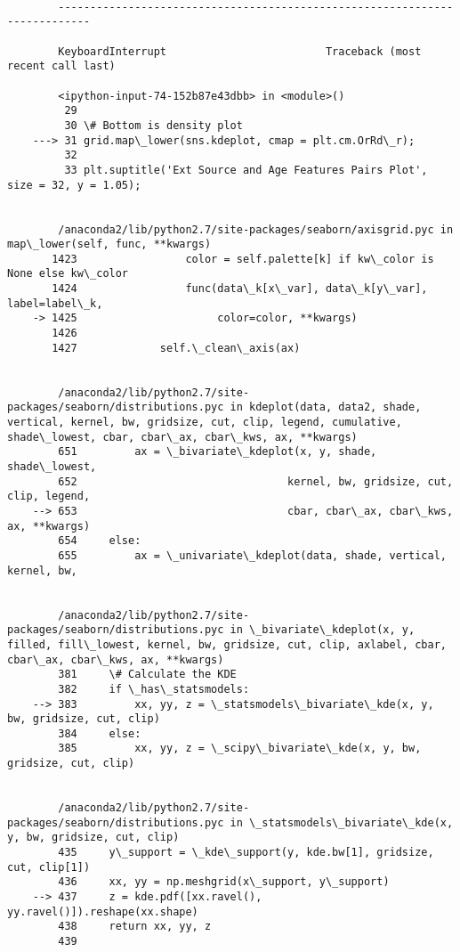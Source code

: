 \documentclass[11pt]{article}
\begin{document}
    \begin{Verbatim}[commandchars=\\\{\}]

        ---------------------------------------------------------------------------

        KeyboardInterrupt                         Traceback (most recent call last)

        <ipython-input-74-152b87e43dbb> in <module>()
         29 
         30 \# Bottom is density plot
    ---> 31 grid.map\_lower(sns.kdeplot, cmap = plt.cm.OrRd\_r);
         32 
         33 plt.suptitle('Ext Source and Age Features Pairs Plot', size = 32, y = 1.05);


        /anaconda2/lib/python2.7/site-packages/seaborn/axisgrid.pyc in map\_lower(self, func, **kwargs)
       1423                 color = self.palette[k] if kw\_color is None else kw\_color
       1424                 func(data\_k[x\_var], data\_k[y\_var], label=label\_k,
    -> 1425                      color=color, **kwargs)
       1426 
       1427             self.\_clean\_axis(ax)


        /anaconda2/lib/python2.7/site-packages/seaborn/distributions.pyc in kdeplot(data, data2, shade, vertical, kernel, bw, gridsize, cut, clip, legend, cumulative, shade\_lowest, cbar, cbar\_ax, cbar\_kws, ax, **kwargs)
        651         ax = \_bivariate\_kdeplot(x, y, shade, shade\_lowest,
        652                                 kernel, bw, gridsize, cut, clip, legend,
    --> 653                                 cbar, cbar\_ax, cbar\_kws, ax, **kwargs)
        654     else:
        655         ax = \_univariate\_kdeplot(data, shade, vertical, kernel, bw,


        /anaconda2/lib/python2.7/site-packages/seaborn/distributions.pyc in \_bivariate\_kdeplot(x, y, filled, fill\_lowest, kernel, bw, gridsize, cut, clip, axlabel, cbar, cbar\_ax, cbar\_kws, ax, **kwargs)
        381     \# Calculate the KDE
        382     if \_has\_statsmodels:
    --> 383         xx, yy, z = \_statsmodels\_bivariate\_kde(x, y, bw, gridsize, cut, clip)
        384     else:
        385         xx, yy, z = \_scipy\_bivariate\_kde(x, y, bw, gridsize, cut, clip)


        /anaconda2/lib/python2.7/site-packages/seaborn/distributions.pyc in \_statsmodels\_bivariate\_kde(x, y, bw, gridsize, cut, clip)
        435     y\_support = \_kde\_support(y, kde.bw[1], gridsize, cut, clip[1])
        436     xx, yy = np.meshgrid(x\_support, y\_support)
    --> 437     z = kde.pdf([xx.ravel(), yy.ravel()]).reshape(xx.shape)
        438     return xx, yy, z
        439 



\end{Verbatim}
\end{document}
